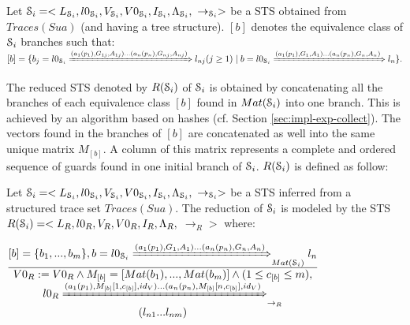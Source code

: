 \begin{definition}
Let
$\EuScript{S}_i=<L_{\EuScript{S}_i},l0_{\EuScript{S}_i},V_{\EuScript{S}_i},V0_{\EuScript{S}_i},I_{\EuScript{S}_i},\Lambda_{\EuScript{S}_i},$
$\rightarrow_{\EuScript{S}_i}>$ be a STS obtained from
$Traces(Sua)$ (and having a tree structure). $[b]$ denotes the
equivalence class of $\EuScript{S}_i$ branches such that: $[b]=\{
b_j= l0_{\EuScript{S}_i}\\
\xRightarrow{(a_1(p_1),G_{1j},A_{1j})\dots(a_n(p_n),G_{nj},A_{nj})}
l_{nj}(j\geq 1) \mid b=l0_{\EuScript{S}_i}
\xRightarrow{(a_1(p_1),G_{1},A_{1})\dots(a_n(p_n),G_{n},A_{n})}
l_n\}.$
\end{definition}

The reduced STS denoted by $R(\EuScript{S}_i)$ of
$\EuScript{S}_i$ is obtained by concatenating all the branches of
each equivalence class $[b]$ found in $Mat(\EuScript{S}_i)$ into
one branch. This is achieved by an algorithm based on hashes (cf.
Section \ref{sec:impl-exp-collect}). The vectors found in the
branches of $[b]$ are concatenated as well into the same unique
matrix $M_{[b]}$. A column of this matrix represents a complete
and ordered sequence of guards found in one initial branch of
$\EuScript{S}_i$. $R(\EuScript{S}_i)$ is defined as follow:

\begin{definition}
	\label{rule:min}

	Let $\EuScript{S}_i=<L_{\EuScript{S}_i},l0_{\EuScript{S}_i},V_{\EuScript{S}_i},V0_{\EuScript{S}_i},I_{\EuScript{S}_i},\Lambda_{\EuScript{S}_i},$ $\rightarrow_{\EuScript{S}_i}>$ be
    a STS inferred from a structured trace set $Traces(Sua)$. The reduction of $\EuScript{S}_i$ is modeled by the STS
	$R(\EuScript{S}_i)= <L_R,l0_R,V_R,V0_R,I_R,\Lambda_R,$
	$\rightarrow_R>$ where:

  \begin{center}
      {\Large
  $\frac{\begin{matrix}
      [b]=\{b_1,...,b_m\},
      b=l0_{\EuScript{S}_i} \xRightarrow{(a_1(p_1),G_{1},A_{1})...(a_n(p_n),G_{n},A_{n})}_{Mat(\EuScript{S}_i)} l_{n}\\
    \end{matrix}
  }
  {\begin{matrix}
      V0_R:=V0_R \wedge M_{[b]}=[Mat(b_1),...,Mat(b_m)] \wedge (1 \leq c_{[b]} \leq m),\\
      l0_R \xRightarrow{(a_1(p_1),M_{[b]}[1,c_{[b]}],id_V)... (a_n(p_n),M_{[b]}[n,c_{[b]}],id_V)}_{\rightarrow_R}\\  (l_{n1}...l_{nm})
    \end{matrix}
  }$
  }
  \end{center}
\end{definition}

